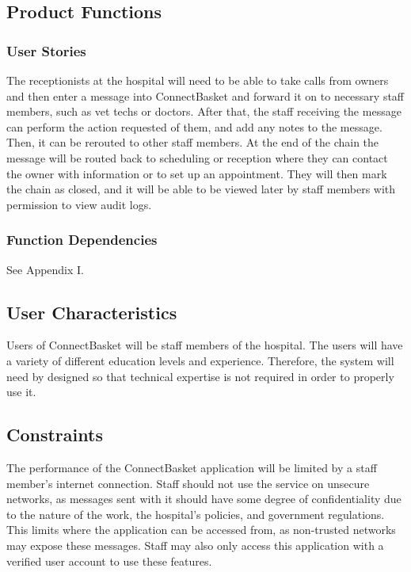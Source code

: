 \documentclass[onecolumn, draftclsnofoot,10pt, compsoc]{IEEEtran}
\begin{document}
\subsection{Product Functions}
\subsubsection{User Stories}
The receptionists at the hospital will need to be able to take calls from owners and then enter a message into ConnectBasket and forward it on to necessary staff members, such as vet techs or doctors. After that, the staff receiving the message can perform the action requested of them, and add any notes to the message. Then, it can be rerouted to other staff members. At the end of the chain the message will be routed back to scheduling or reception where they can contact the owner with information or to set up an appointment. They will then mark the chain as closed, and it will be able to be viewed later by staff members with permission to view audit logs.
\subsubsection{Function Dependencies}
See Appendix I.

\subsection{User Characteristics}
Users of ConnectBasket will be staff members of the hospital. The users will have a variety of different education levels and experience. Therefore, the system will need by designed so that technical expertise is not required in order to properly use it.

\subsection{Constraints}
The performance of the ConnectBasket application will be limited by a staff member's internet connection. Staff should not use the service on unsecure networks, as messages sent with it should have some degree of confidentiality due to the nature of the work, the hospital's policies, and government regulations. This limits where the application can be accessed from, as non-trusted networks may expose these messages. Staff may also only access this application with a verified user account to use these features.
\end{document}

